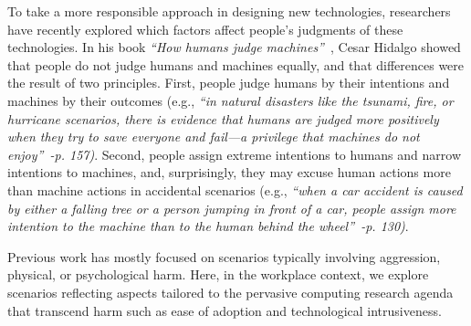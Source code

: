 To take a more responsible approach in designing new technologies, researchers have recently explored which factors affect people's judgments of these technologies. In his book \emph{``How humans judge machines''}~\cite{hidalgo2021humans}, Cesar Hidalgo showed that people do not judge humans and machines equally, and that differences were the result of two principles. First, people judge humans by their intentions and machines by their outcomes (e.g., \emph{``in natural disasters like the tsunami, fire, or hurricane scenarios, there is evidence that humans are judged more positively when they try to save everyone and fail---a privilege that machines do not enjoy''~\cite{hidalgo2021humans}-p. 157)}. Second, people assign extreme intentions to humans and narrow intentions to machines, and, surprisingly, they may excuse human actions more than machine actions in accidental scenarios
(e.g., \emph{``when a car accident is caused by either a falling tree or a person jumping in front of a car, people assign more intention to the machine than to the human behind the wheel''~\cite{hidalgo2021humans}-p. 130)}.

Previous work has mostly focused on scenarios typically involving aggression, physical, or psychological harm. Here, in the workplace context, we explore scenarios reflecting aspects tailored to the pervasive computing research agenda that transcend harm such as ease of adoption and technological intrusiveness. 